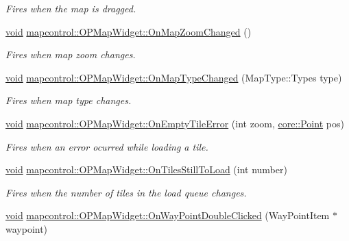 \begin{DoxyCompactItemize}
\begin{DoxyCompactList}\small\item\em \-Fires when the map is dragged. \end{DoxyCompactList}\item 
\hyperlink{group___u_a_v_objects_plugin_ga444cf2ff3f0ecbe028adce838d373f5c}{void} \hyperlink{group___o_p_map_widget_ga6cff965989ae7d23b98d5345c3912492}{mapcontrol\-::\-O\-P\-Map\-Widget\-::\-On\-Map\-Zoom\-Changed} ()
\begin{DoxyCompactList}\small\item\em \-Fires when map zoom changes. \end{DoxyCompactList}\item 
\hyperlink{group___u_a_v_objects_plugin_ga444cf2ff3f0ecbe028adce838d373f5c}{void} \hyperlink{group___o_p_map_widget_gad0bd8494b0fba444bad76bcf3c1bdb0a}{mapcontrol\-::\-O\-P\-Map\-Widget\-::\-On\-Map\-Type\-Changed} (\-Map\-Type\-::\-Types type)
\begin{DoxyCompactList}\small\item\em \-Fires when map type changes. \end{DoxyCompactList}\item 
\hyperlink{group___u_a_v_objects_plugin_ga444cf2ff3f0ecbe028adce838d373f5c}{void} \hyperlink{group___o_p_map_widget_gad393b8af8f879239faaa466bbc33f4b7}{mapcontrol\-::\-O\-P\-Map\-Widget\-::\-On\-Empty\-Tile\-Error} (int zoom, \hyperlink{structcore_1_1_point}{core\-::\-Point} pos)
\begin{DoxyCompactList}\small\item\em \-Fires when an error ocurred while loading a tile. \end{DoxyCompactList}\item 
\hyperlink{group___u_a_v_objects_plugin_ga444cf2ff3f0ecbe028adce838d373f5c}{void} \hyperlink{group___o_p_map_widget_gad7537ed2e10658cabe5f1f320f31b83f}{mapcontrol\-::\-O\-P\-Map\-Widget\-::\-On\-Tiles\-Still\-To\-Load} (int number)
\begin{DoxyCompactList}\small\item\em \-Fires when the number of tiles in the load queue changes. \end{DoxyCompactList}\item 
\hyperlink{group___u_a_v_objects_plugin_ga444cf2ff3f0ecbe028adce838d373f5c}{void} \hyperlink{group___o_p_map_widget_ga76257e275a9d3c05a75b0fca87faba3d}{mapcontrol\-::\-O\-P\-Map\-Widget\-::\-On\-Way\-Point\-Double\-Clicked} (\-Way\-Point\-Item $\ast$waypoint)
\item 

\end{DoxyCompactItemize}
